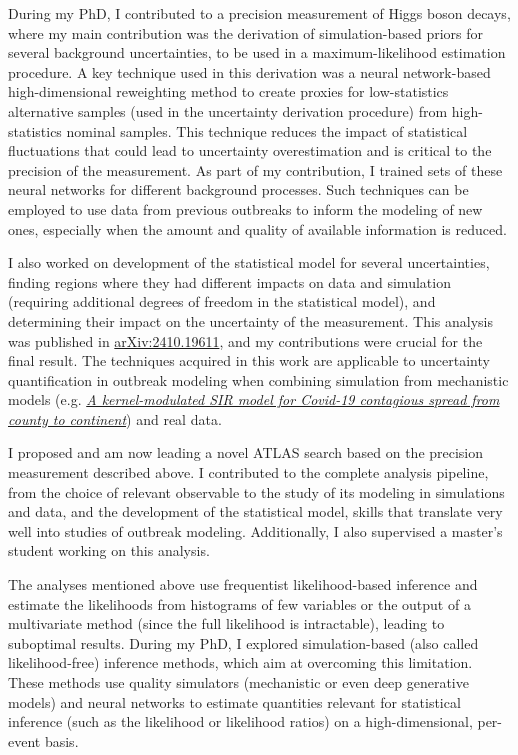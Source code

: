 \documentclass[11pt, a4paper]{awesome-cv}
\begin{document}
\begin{cvletter}
During my PhD, I contributed to a precision measurement of Higgs boson decays, where my main contribution was the derivation of simulation-based priors for several background uncertainties, to be used in a maximum-likelihood estimation procedure. A key technique used in this derivation was a neural network-based high-dimensional reweighting method to create proxies for low-statistics alternative samples (used in the uncertainty derivation procedure) from high-statistics nominal samples. This technique reduces the impact of statistical fluctuations that could lead to uncertainty overestimation and is critical to the precision of the measurement. As part of my contribution, I trained sets of these neural networks for different background processes. Such techniques can be employed to use data from previous outbreaks to inform the modeling of new ones, especially when the amount and quality of available information is reduced.

I also worked on development of the statistical model for several uncertainties, finding regions where they had different impacts on data and simulation (requiring additional degrees of freedom in the statistical model), and determining their impact on the uncertainty of the measurement. This analysis was published in \href{https://arxiv.org/abs/2410.19611}{arXiv:2410.19611}, and my contributions were crucial for the final result. The techniques acquired in this work are applicable to uncertainty quantification in outbreak modeling when combining simulation from mechanistic models (e.g. \href{https://pubmed.ncbi.nlm.nih.gov/33958443/}{\textit{A kernel-modulated SIR model for Covid-19 contagious spread from county to continent}}) and real data.

I proposed and am now leading a novel ATLAS search based on the precision measurement described above. I contributed to the complete analysis pipeline, from the choice of relevant observable to the study of its modeling in simulations and data, and the development of the statistical model, skills that translate very well into studies of outbreak modeling. Additionally, I also supervised a master's student working on this analysis.


The analyses mentioned above use frequentist likelihood-based inference and estimate the likelihoods from histograms of few variables or the output of a multivariate method (since the full likelihood is intractable), leading to suboptimal results. During my PhD, I explored simulation-based (also called likelihood-free) inference methods, which aim at overcoming this limitation. These methods use quality simulators (mechanistic or even deep generative models) and neural networks to estimate quantities relevant for statistical inference (such as the likelihood or likelihood ratios) on a high-dimensional, per-event basis.


\end{cvletter}
\end{document}
